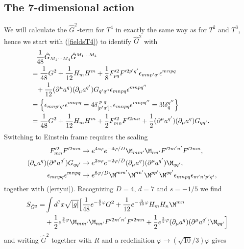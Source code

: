 \subsection{The 7-dimensional action}

We will calculate the $\hat{G}^2$-term for $T^4$ in exactly the same way as for $T^2$ and $T^3$, hence we start with (\ref{fieldsT4}) to identify $\hat{G}^2$ with
\begin{align}
&\phantom{=}{1 \over 48}\hat{G}_{M_{1} \cdots M_{4}} \hat{G}^{M_{1} \cdots M_{4}} \nonumber \\
&= {1 \over 48}G^2 + {1 \over 12}H_m H^m + {1 \over 8}F'^{2}_{pq}F'^{2p'q'}{\epsilon}_{mnp'q'}{\epsilon}^{mnpq} \nonumber \\
&\phantom{=}+{1 \over 12}({\partial}^{\mu} a^q)({\partial}_{\mu}a^{q'})G_{q'q''}{\epsilon}_{mnpq}{\epsilon}^{mnpq''} \nonumber \\
&= \Big{\{} {\epsilon}_{mnp'q'}{\epsilon}^{mnpq}=4 \delta^{ \phantom{[} p \phantom{'} q}_{[p'q']}, {\epsilon}_{mnpq}{\epsilon}^{mnpq''}=3! \delta^{q''}_{q} \Big{\}} \nonumber \\
&= {1 \over 48}G^2 + {1 \over 12}H_m H^m + {1 \over 2}F'^{2}_{mn}F'^{2mn} + {1 \over 2}({\partial}^{\mu} a^{q'})({\partial}_{\mu}a^{q})G_{qq'}.\phantom{iiiiii}
\end{align}
Switching to Einstein frame requires the scaling
\begin{align} 
F'^2_{mn} F'^{2mn} &\rightarrow e^{4s \varphi}e^{-4\varphi /D}\M_{mm'}\M_{nn'}F'^{2m'n'}F'^{2mn}, \nonumber \\
({\partial}_{\mu} a^q)({\partial}^{\mu} a^{q'})G_{qq'} &\rightarrow e^{2s\varphi} e^{-2\varphi /D} ({\partial}_{\mu} a^q)({\partial}^{\mu} a^{q'}) \M_{qq'}, \nonumber \\
{\epsilon}_{mnpq}{\epsilon}^{mnpq} &\rightarrow e^{8\varphi /D}\M^{mm'}\M^{nn'}\M^{pp'}\M^{qq'} {\epsilon}_{mnpq}{\epsilon}_{m'n'p'q'},\phantom{iiii}
\end{align}
together with (\ref{ertyui}). Recognizing $D=4$, $d=7$ and $s=-1/5$ we find
\begin{align}
S_{\hat G^2} =& \int d^7x \sqrt{|g|} \Big{[} {1 \over 48}e^{-{6 \over 5}\varphi}G^2 + {1 \over 12}e^{-{3 \over 10}\varphi}H_mH_n\M^{mn} \nonumber \\
&+ {1 \over 2}e^{{3 \over 5}\varphi}\M_{mm'}\M_{nn'}F'^{2m'n'}F'^{2mn} + {1 \over 2}e^{{3 \over 2}\varphi}({\partial}_{\mu}a^{q})({\partial}^{\mu}a^{q'})\M_{qq'} \Big{]}
\end{align}
and writing $\hat{G}^2$ together with $R$ and a redefinition $\varphi \rightarrow (\sqrt{10}/3) \varphi$ gives
